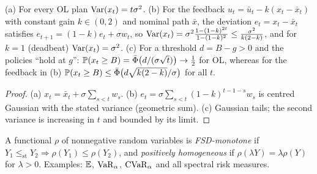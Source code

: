 \begin{proposition}\label{prop:var}
(a) For every OL plan $\operatorname{Var}(x_t)=t\sigma^2$.
(b) For the feedback $u_t=\bar u_t-k(x_t-\bar x_t)$ with constant gain $k\in(0,2)$ and nominal path $\bar x$, the deviation $e_t=x_t-\bar x_t$ satisfies $e_{t+1}=(1-k)e_t+\sigma w_t$, so
$\operatorname{Var}(x_t)=\sigma^2\frac{1-(1-k)^{2t}}{1-(1-k)^2}\le\frac{\sigma^2}{k(2-k)}$, and for $k=1$ (deadbeat) $\operatorname{Var}(x_t)=\sigma^2$.
(c) For a threshold $d=B-g>0$ and the policies ``hold at $g$'': $\mathbb{P}(x_t\ge B)=\bar\Phi\bigl(d/(\sigma\sqrt t)\bigr)\to\tfrac12$ for OL, whereas for the feedback in (b) $\mathbb{P}(x_t\ge B)\le\bar\Phi\bigl(d\sqrt{k(2-k)}/\sigma\bigr)$ for all $t$.
\end{proposition}
\begin{proof}
(a) $x_t=\bar x_t+\sigma\sum_{s<t}w_s$. (b) $e_t=\sigma\sum_{s<t}(1-k)^{t-1-s}w_s$ is centred Gaussian with the stated variance (geometric sum). (c) Gaussian tails; the second variance is increasing in $t$ and bounded by its limit.
\end{proof}

\begin{definition}
A functional $\rho$ of nonnegative random variables is \emph{FSD-monotone} if $Y_1\le_{\mathrm{st}}Y_2\Rightarrow\rho(Y_1)\le\rho(Y_2)$, and \emph{positively homogeneous} if $\rho(\lambda Y)=\lambda\rho(Y)$ for $\lambda>0$. Examples: $\mathbb{E}$, $\operatorname{VaR}_\alpha$, $\operatorname{CVaR}_\alpha$ and all spectral risk measures.
\end{definition}

